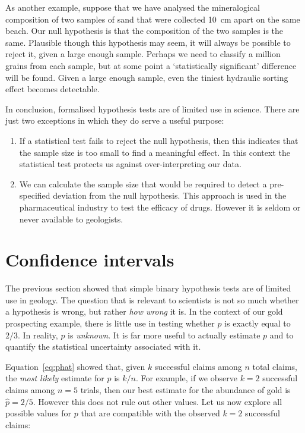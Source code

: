 As another example, suppose that we have analysed the mineralogical
composition of two samples of sand that were collected 10~cm apart on
the same beach. Our null hypothesis is that the composition of the two
samples is the same. Plausible though this hypothesis may seem, it
will always be possible to reject it, given a large enough
sample. Perhaps we need to classify a million grains from each sample,
but at some point a `statistically significant' difference will be
found. Given a large enough sample, even the tiniest hydraulic sorting
effect becomes detectable.\medskip

In conclusion, formalised hypothesis tests are of limited use in
science.  There are just two exceptions in which they do serve a
useful purpose:

\begin{enumerate}
\item If a statistical test fails to reject the null hypothesis, then
  this indicates that the sample size is too small to find a
  meaningful effect. In this context the statistical test protects
  us against over-interpreting our data.
\item We can calculate the sample size that would be required to
  detect a pre-specified deviation from the null hypothesis.  This
  approach is used in the pharmaceutical industry to test the efficacy
  of drugs. However it is seldom or never available to geologists.
\end{enumerate}

\section{Confidence intervals}
\label{sec:binomCI}

The previous section showed that simple binary hypothesis tests are of
limited use in geology. The question that is relevant to scientists is
not so much whether a hypothesis is wrong, but rather \emph{how wrong}
it is. In the context of our gold prospecting example, there is little
use in testing whether $p$ is exactly equal to $2/3$. In reality, $p$
is \emph{unknown}. It is far more useful to actually estimate $p$ and
to quantify the statistical uncertainty associated with it.\medskip

Equation~\ref{eq:phat} showed that, given $k$ successful claims among
$n$ total claims, the \emph{most likely} estimate for $p$ is $k/n$.
For example, if we observe $k=2$ successful claims among $n=5$ trials,
then our best estimate for the abundance of gold is $\hat{p}=2/5$.
However this does not rule out other values. Let us now explore all
possible values for $p$ that are compatible with the observed $k=2$
successful claims:

